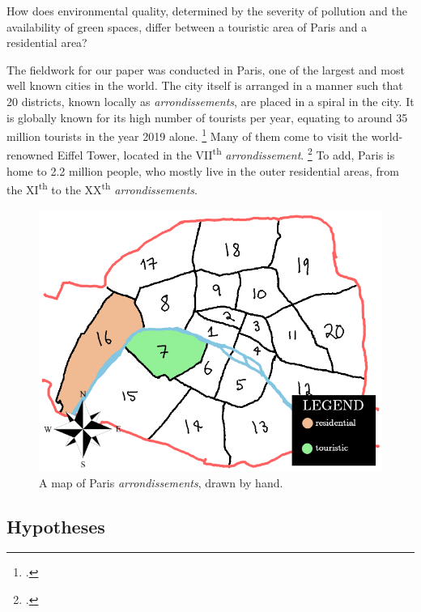 \documentclass[11pt,letterpaper]{article}
\begin{document}
How does environmental quality, determined by the severity of pollution and the availability of green spaces, differ between a touristic area of Paris and a residential area?

The fieldwork for our paper was conducted in Paris, one of the largest and most well known cities in the world. The city itself is arranged in a manner such that 20 districts, known locally as \textit{arrondissements}, are placed in a spiral in the city. It is globally known for its high number of tourists per year, equating to around 35 million tourists in the year 2019 alone. \footcite{statista_department_27_2020} Many of them come to visit the world-renowned Eiffel Tower, located in the VII\textsuperscript{th} \textit{arrondissement}. \footcite{condor_ferries} To add, Paris is home to 2.2 million people, who mostly live in the outer residential areas, from the XI\textsuperscript{th} to the XX\textsuperscript{th} \textit{arrondissements}.

\begin{figure}[h!]
    \centering
    \includegraphics[width=0.7\linewidth]{arrts.png}
    \caption{A map of Paris \textit{arrondissements}, drawn by hand.}
\end{figure}



\subsection{Hypotheses}
\end{document}
